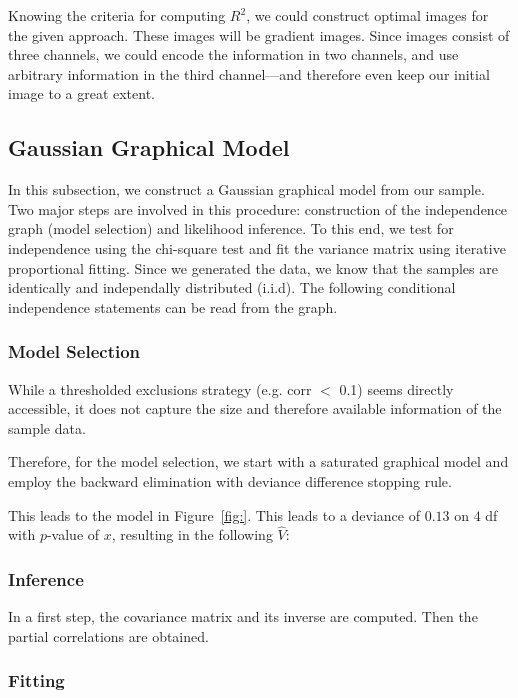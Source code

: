 \documentclass{article}
\begin{document}
Knowing the criteria for computing $R^2$, we could construct optimal
images for the given approach. These images will be gradient
images. Since images consist of three channels, we could encode the
information in two channels, and use arbitrary information in the
third channel---and therefore even keep our initial image to a great
extent.


\subsection{Gaussian Graphical Model}

In this subsection, we construct a Gaussian graphical model from our
sample. Two major steps are involved in this procedure: construction
of the independence graph (model selection) and likelihood
inference. To this end, we test for independence using the chi-square
test and fit the variance matrix using iterative proportional
fitting. Since we generated the data, we know that the samples are
identically and independally distributed (i.i.d). The following
conditional independence statements can be read from the graph.

\subsubsection{Model Selection}

While a thresholded exclusions strategy (e.g. corr $<$ 0.1) seems
directly accessible, it does not capture the size and therefore
available information of the sample data.

Therefore, for the model selection, we start with a saturated
graphical model and employ the backward elimination with deviance
difference stopping rule.

This leads to the model in Figure~\ref{fig:}. This leads to a deviance
of $0.13$ on $4$ df with $p$-value of $x$, resulting in the following
$\hat{V}$:

\subsubsection{Inference}

In a first step, the covariance matrix and its inverse are
computed. Then the partial correlations are obtained.


\subsubsection{Fitting}
\end{document}
